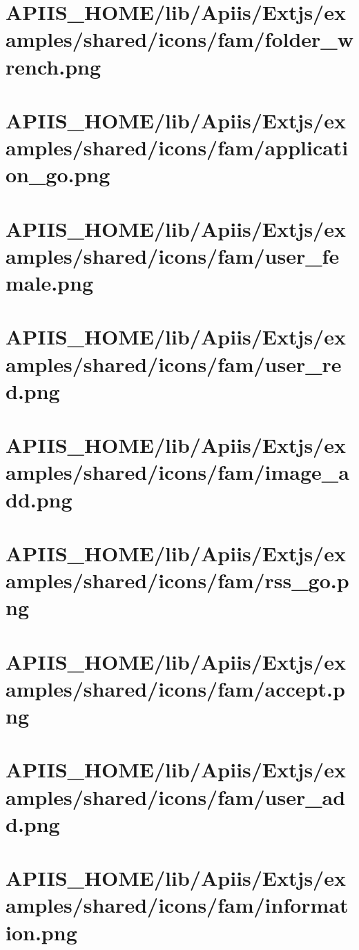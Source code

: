 \section{APIIS\_HOME/lib/Apiis/Extjs/examples/shared/icons/fam/folder\_wrench.png} 
\section{APIIS\_HOME/lib/Apiis/Extjs/examples/shared/icons/fam/application\_go.png} 
\section{APIIS\_HOME/lib/Apiis/Extjs/examples/shared/icons/fam/user\_female.png} 
\section{APIIS\_HOME/lib/Apiis/Extjs/examples/shared/icons/fam/user\_red.png} 
\section{APIIS\_HOME/lib/Apiis/Extjs/examples/shared/icons/fam/image\_add.png} 
\section{APIIS\_HOME/lib/Apiis/Extjs/examples/shared/icons/fam/rss\_go.png} 
\section{APIIS\_HOME/lib/Apiis/Extjs/examples/shared/icons/fam/accept.png} 
\section{APIIS\_HOME/lib/Apiis/Extjs/examples/shared/icons/fam/user\_add.png} 
\section{APIIS\_HOME/lib/Apiis/Extjs/examples/shared/icons/fam/information.png} 
